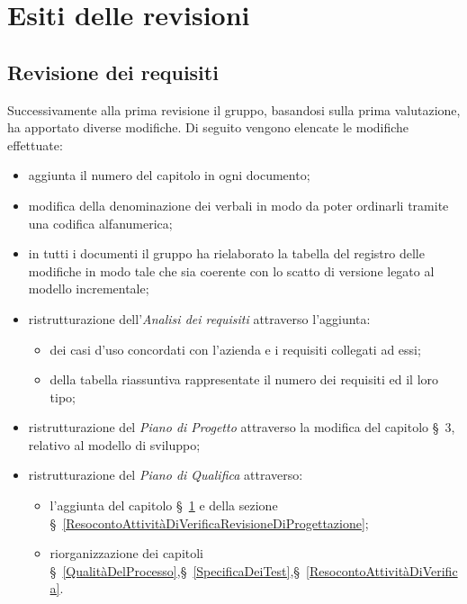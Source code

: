 \chapter{Esiti delle revisioni}\label{EsitiDelleRevisioni}

\section{Revisione dei requisiti}\label{EsitiDelleRevisioniRevisioneDeiRequisiti}

Successivamente alla prima revisione il gruppo, basandosi sulla prima valutazione, ha apportato diverse modifiche. Di seguito vengono elencate le modifiche effettuate:
\begin{itemize}
	\item aggiunta il numero del capitolo in ogni documento;
	\item modifica della denominazione dei verbali in modo da poter ordinarli tramite una codifica alfanumerica; 
	\item in tutti i documenti il gruppo ha rielaborato la tabella del registro delle modifiche in modo tale che sia coerente con lo scatto di versione legato al modello incrementale;
	\item ristrutturazione dell'\textit{Analisi dei requisiti} attraverso l'aggiunta: 
	\begin{itemize}
		\item dei casi d'uso concordati con l'azienda e i requisiti collegati ad essi;
		\item della tabella riassuntiva rappresentate il numero dei requisiti ed il loro tipo;
	\end{itemize}
	\item ristrutturazione del \textit{Piano di Progetto} attraverso la modifica del capitolo \S~3, relativo al modello di sviluppo;
	\item ristrutturazione del \textit{Piano di Qualifica} attraverso:
	\begin{itemize}
		\item l'aggiunta del capitolo \S~\ref{EsitiDelleRevisioni} e della sezione \S~\ref{ResocontoAttivitàDiVerificaRevisioneDiProgettazione};%
		\item riorganizzazione dei capitoli \S~\ref{QualitàDelProcesso},\S~\ref{SpecificaDeiTest},\S~\ref{ResocontoAttivitàDiVerifica}.
	\end{itemize}
\end{itemize}